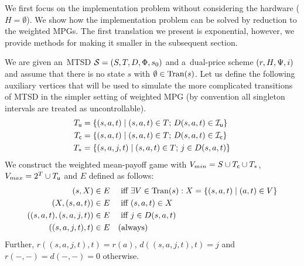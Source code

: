 
We first focus on the implementation problem without considering 
the hardware ($H=\emptyset$).
We show how the implementation problem can be solved by reduction to the
weighted MPGs. The first translation we present is exponential, 
however, we provide methods for making it smaller 
in the subsequent section.

We are given an~MTSD $\mathcal S = (S,T,D,\Phi,s_0)$ and a~dual-price scheme
$(r,H,\Psi,i)$ and assume that there is no state $s$ with $\emptyset \in
\mathrm{Tran}(s)$. 
Let us define the following auxiliary
vertices that will be used to simulate the more complicated transitions of MTSD
in the simpler setting of weighted MPG (by convention all singleton
intervals are treated as uncontrollable).
\begin{align*}
T_\mathsf u &= \{(s,a,t) \mid (s,a,t) \in T;\,D(s,a,t) \in \mathcal I_\mathsf u\}\\
T_\mathsf c &= \{(s,a,t) \mid (s,a,t) \in T;\,D(s,a,t) \in \mathcal I_\mathsf c\}\\
T_*  &= \{(s,a,j,t) \mid (s,a,t) \in T;\,j \in D(s,a,t) \}
\end{align*}
We construct the weighted mean-payoff game with
$V_{min} = S \cup T_\mathsf c \cup T_*$, 
$V_{max} = 2^T \cup T_\mathsf u$ and
$E$ defined as follows:
\begin{align*}
	(s, X) &\in E &&\text{ iff } \exists V \in \mathrm{Tran}(s) : 
	X = \{ (s,a,t) \mid (a,t) \in V\}\\
	(X,(s,a,t)) &\in E &&\text{ iff } (s,a,t) \in X\\
	((s,a,t),(s,a,j,t)) &\in E &&\text{ iff } j \in D(s,a,t)\\
	((s,a,j,t),t) &\in E && \text{(always)}
\end{align*}
Further, 
$r((s,a,j,t),t) = r(a)$, $d((s,a,j,t),t) = j$
and $r(-,-) = d(-,-) = 0$ otherwise.



